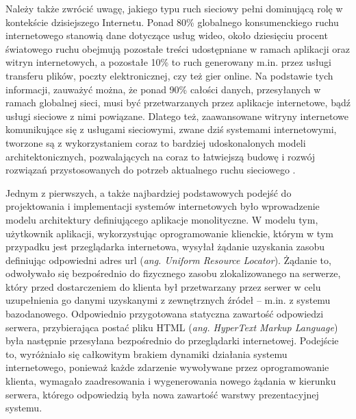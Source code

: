 Należy także zwrócić uwagę, jakiego typu ruch sieciowy pełni dominującą rolę w kontekście dzisiejszego Internetu. Ponad 80\% globalnego konsumenckiego ruchu internetowego stanowią dane dotyczące usług wideo, około dziesięciu procent światowego ruchu obejmują pozostałe treści udostępniane w ramach aplikacji oraz witryn internetowych, a pozostałe 10\% to ruch generowany m.in. przez usługi transferu plików, poczty elektronicznej, czy też gier online. Na podstawie tych informacji, zauważyć można, że ponad 90\% całości danych, przesyłanych w ramach globalnej sieci, musi być przetwarzanych przez aplikacje internetowe, bądź usługi sieciowe z nimi powiązane. Dlatego też, zaawansowane witryny internetowe komunikujące się z usługami sieciowymi, zwane dziś systemami internetowymi, tworzone są z wykorzystaniem coraz to bardziej udoskonalonych modeli architektonicznych, pozwalających na coraz to łatwiejszą budowę i rozwój rozwiązań przystosowanych do potrzeb aktualnego ruchu sieciowego \cite{CAIR20182023}.

Jednym z pierwszych, a także najbardziej podstawowych podejść do projektowania i implementacji systemów internetowych było wprowadzenie modelu architektury definiującego aplikacje monolityczne. W modelu tym, użytkownik aplikacji, wykorzystując oprogramowanie klienckie, którym w tym przypadku jest przeglądarka internetowa, wysyłał żądanie uzyskania zasobu definiując odpowiedni adres url (\textit{ang. Uniform Resource Locator}). Żądanie to, odwoływało się bezpośrednio do fizycznego zasobu zlokalizowanego na serwerze, który przed dostarczeniem do klienta był przetwarzany przez serwer w celu uzupełnienia go danymi uzyskanymi z zewnętrznych źródeł -- m.in. z systemu bazodanowego. Odpowiednio przygotowana statyczna zawartość odpowiedzi serwera, przybierająca postać pliku HTML (\textit{ang. HyperText Markup Language}) była następnie przesyłana bezpośrednio do przeglądarki internetowej. Podejście to, wyróżniało się całkowitym brakiem dynamiki działania systemu internetowego, ponieważ każde zdarzenie wywoływane przez oprogramowanie klienta, wymagało zaadresowania i wygenerowania nowego żądania w kierunku serwera, którego odpowiedzią była nowa zawartość warstwy prezentacyjnej systemu.

